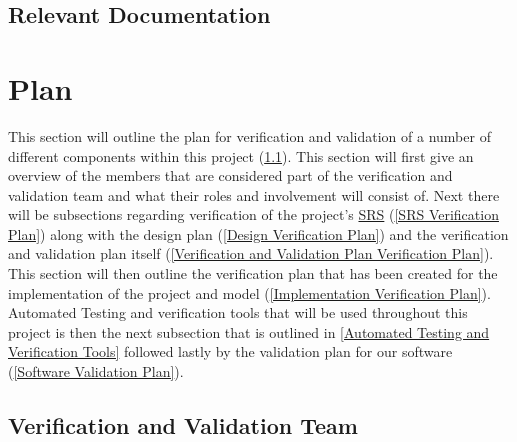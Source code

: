 \documentclass[12pt, titlepage]{article}
\begin{document}

\subsection{Relevant Documentation}


\citet{SRS}


\section{Plan}

This section will outline the plan for verification and validation of a number of different components within this project  (\ref{Verification and Validation Team}). This section will first give an overview of the members that are considered part of the verification and validation team and what their roles and involvement will consist of. Next there will be subsections regarding verification of the project's \href{https://github.com/MichaelBreau/nlp-mentalhealth/blob/main/docs/SRS/index.pdf}{SRS} (\ref{SRS Verification Plan}) along with the design plan (\ref{Design Verification Plan}) and the verification and validation plan itself (\ref{Verification and Validation Plan Verification Plan}). This section will then outline the verification plan that has been created for the implementation of the project and model (\ref{Implementation Verification Plan}). Automated Testing and verification tools that will be used throughout this project is then the next subsection that is outlined in \ref{Automated Testing and Verification Tools} followed lastly by the validation plan for our software (\ref{Software Validation Plan}).
  
  \subsection{Verification and Validation Team} \label{Verification and Validation Team}
\end{document}
